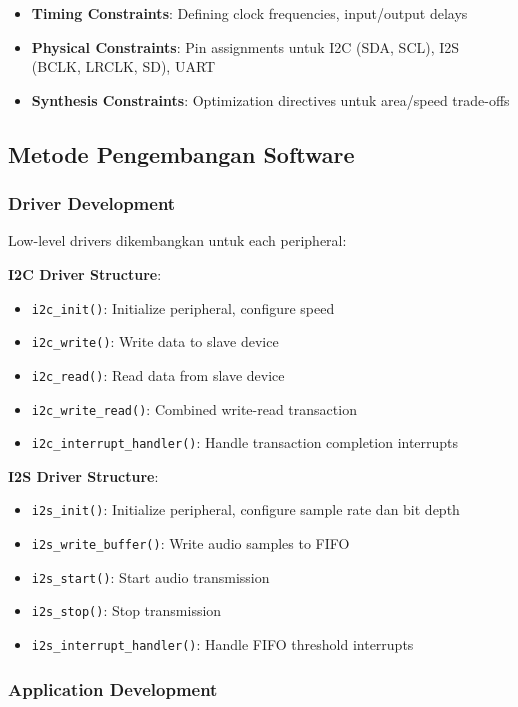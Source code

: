 \begin{itemize}
	\item \textbf{Timing Constraints}: Defining clock frequencies, input/output delays
	\item \textbf{Physical Constraints}: Pin assignments untuk I2C (SDA, SCL), I2S (BCLK, LRCLK, SD), UART
	\item \textbf{Synthesis Constraints}: Optimization directives untuk area/speed trade-offs
\end{itemize}

\subsection{Metode Pengembangan Software}

\subsubsection{Driver Development}

Low-level drivers dikembangkan untuk each peripheral:

\textbf{I2C Driver Structure}:
\begin{itemize}
	\item \texttt{i2c\_init()}: Initialize peripheral, configure speed
	\item \texttt{i2c\_write()}: Write data to slave device
	\item \texttt{i2c\_read()}: Read data from slave device
	\item \texttt{i2c\_write\_read()}: Combined write-read transaction
	\item \texttt{i2c\_interrupt\_handler()}: Handle transaction completion interrupts
\end{itemize}

\textbf{I2S Driver Structure}:
\begin{itemize}
	\item \texttt{i2s\_init()}: Initialize peripheral, configure sample rate dan bit depth
	\item \texttt{i2s\_write\_buffer()}: Write audio samples to FIFO
	\item \texttt{i2s\_start()}: Start audio transmission
	\item \texttt{i2s\_stop()}: Stop transmission
	\item \texttt{i2s\_interrupt\_handler()}: Handle FIFO threshold interrupts
\end{itemize}

\subsubsection{Application Development}

